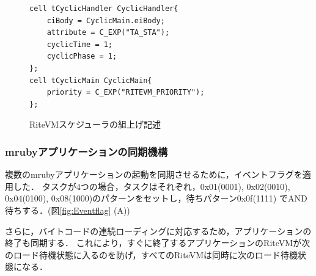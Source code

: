 \documentclass[submit,techrep]{ipsj}
\begin{document}
\begin{figure}[t]
    \centering
    \begin{lstlisting}
cell tCyclicHandler CyclicHandler{
    ciBody = CyclicMain.eiBody;
    attribute = C_EXP("TA_STA");
    cyclicTime = 1;
    cyclicPhase = 1;
};
cell tCyclicMain CyclicMain{
    priority = C_EXP("RITEVM_PRIORITY");
};
   \end{lstlisting}
    \vspace{-2mm}
    \caption{RiteVMスケジューラの組上げ記述}
\vspace{-3mm}
    \label{build_cyclic_handler}
\end{figure}
 
\subsubsection{mrubyアプリケーションの同期機構}
複数のmrubyアプリケーションの起動を同期させるために，イベントフラグを適用した．
タスクが4つの場合，タスクはそれぞれ，0x01(0001), 0x02(0010), 0x04(0100), 0x08(1000)のパターンをセットし，待ちパターン0x0f(1111) でAND待ちする．(図\ref{fig:Eventflag} (A))

さらに，バイトコードの連続ローディングに対応するため，アプリケーションの終了も同期する．
これにより，すぐに終了するアプリケーションのRiteVMが次のロード待機状態に入るのを防げ，すべてのRiteVMは同時に次のロード待機状態になる．
\end{document}

